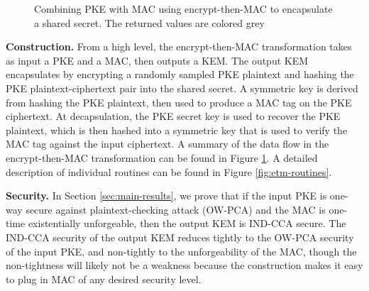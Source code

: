 \documentclass[journal=tches,submission]{iacrtrans}
\newcommand{\mac}{\texttt{MAC}}
\newcommand{\pk}{\texttt{pk}}
\newcommand{\leftsample}{\stackrel{\$}{\leftarrow}}
\begin{document}
\begin{figure}
    \centering

    \caption{Combining PKE with MAC using encrypt-then-MAC to encapsulate a shared secret. 
    The returned values are colored grey
    }\label{fig:etm-diagram}
\end{figure}

\textbf{Construction.} From a high level, the encrypt-then-MAC transformation takes as input a PKE and a MAC, then outputs a KEM. The output KEM encapsulates by encrypting a randomly sampled PKE plaintext and hashing the PKE plaintext-ciphertext pair into the shared secret. A symmetric key is derived from hashing the PKE plaintext, then used to produce a MAC tag on the PKE ciphertext. At decapsulation, the PKE secret key is used to recover the PKE plaintext, which is then hashed into a symmetric key that is used to verify the MAC tag against the input ciphertext. A summary of the data flow in the encrypt-then-MAC transformation can be found in Figure \ref{fig:etm-diagram}. A detailed description of individual routines can be found in Figure \ref{fig:etm-routines}.

\textbf{Security.} In Section \ref{sec:main-results}, we prove that if the input PKE is one-way secure against plaintext-checking attack (OW-PCA) and the MAC is one-time existentially unforgeable, then the output KEM is IND-CCA secure. The IND-CCA security of the output KEM reduces tightly to the OW-PCA security of the input PKE, and non-tightly to the unforgeability of the MAC, though the non-tightness will likely not be a weakness because the construction makes it easy to plug in MAC of any desired security level.
\end{document}
